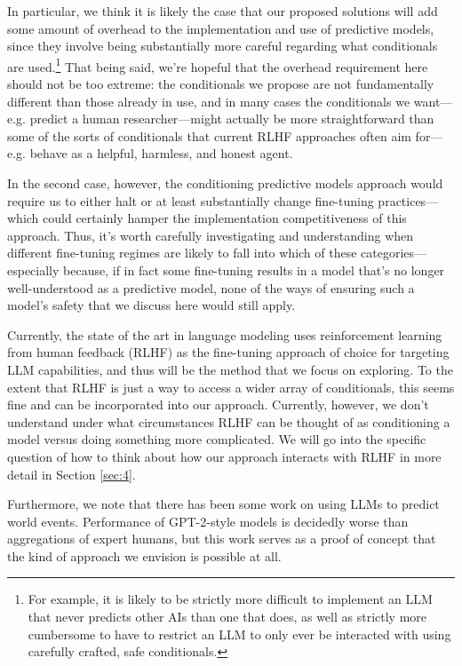 \documentclass[
  twocolumn,
  natbib,
]{miri-tech-article}
\begin{document}
In particular, we think it is likely the case that our proposed solutions will add some amount of overhead to the implementation and use of predictive models, since they involve being substantially more careful regarding what conditionals are used.\footnote{For example, it is likely to be strictly more difficult to implement an LLM that never predicts other AIs than one that does, as well as strictly more cumbersome to have to restrict an LLM to only ever be interacted with using carefully crafted, safe conditionals.} That being said, we're hopeful that the overhead requirement here should not be too extreme: the conditionals we propose are not fundamentally different than those already in use, and in many cases the conditionals we want---e.g. predict a human researcher---might actually be more straightforward than some of the sorts of conditionals that current RLHF approaches often aim for---e.g. behave as a helpful, harmless, and honest agent\cite{bai_training_2022}.

In the second case, however, the conditioning predictive models approach would require us to either halt or at least substantially change fine-tuning practices---which could certainly hamper the implementation competitiveness of this approach. Thus, it's worth carefully investigating and understanding when different fine-tuning regimes are likely to fall into which of these categories---especially because, if in fact some fine-tuning results in a model that's no longer well-understood as a predictive model, none of the ways of ensuring such a model's safety that we discuss here would still apply.

Currently, the state of the art in language modeling uses reinforcement learning from human feedback (RLHF) as the fine-tuning approach of choice for targeting LLM capabilities, and thus will be the method that we focus on exploring. To the extent that RLHF is just a way to access a wider array of conditionals\cite{conditioning_prompts_fine_tuning}, this seems fine and can be incorporated into our approach. Currently, however, we don't understand under what circumstances RLHF can be thought of as conditioning a model versus doing something more complicated. We will go into the specific question of how to think about how our approach interacts with RLHF in more detail in Section \ref{sec:4}.

Furthermore, we note that there has been some work\cite{zou_forecasting_2022} on using LLMs to predict world events. Performance of GPT-2-style models is decidedly worse than aggregations of expert humans, but this work serves as a proof of concept that the kind of approach we envision is possible at all.
\end{document}
